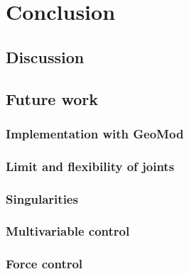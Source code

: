 \chapter{Conclusion}

\section{Discussion}


\section{Future work}
\subsection{Implementation with GeoMod}
\subsection{Limit and flexibility of joints}
\subsection{Singularities}
\subsection{Multivariable control}
\subsection{Force control}